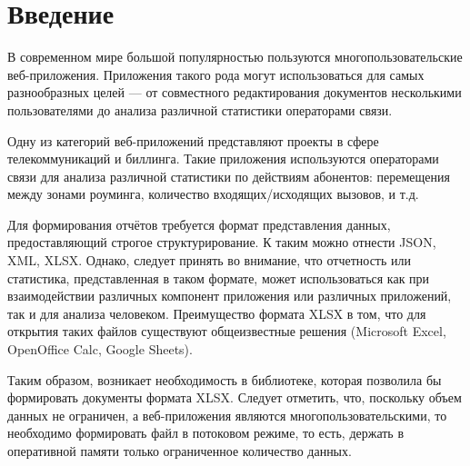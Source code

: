 \documentclass[14pt]{matmex-diploma}
\begin{document}
\maketitle
\tableofcontents
\section*{Введение}
В современном мире большой популярностью пользуются многопользовательские веб-приложения. Приложения такого рода могут использоваться для самых разнообразных целей --- от совместного редактирования документов несколькими пользователями до анализа различной статистики операторами связи.

Одну из категорий веб-приложений представляют проекты в сфере телекоммуникаций и биллинга. Такие приложения используются операторами связи для анализа различной статистики по действиям абонентов: перемещения между зонами роуминга, количество входящих/исходящих вызовов, и т.д.

Для формирования отчётов требуется формат представления данных, предоставляющий строгое структурирование. К таким можно отнести JSON, XML, XLSX. Однако, следует принять во внимание, что отчетность или статистика, представленная в таком формате, может использоваться как при взаимодействии различных компонент приложения или различных приложений, так и для анализа человеком. Преимущество формата XLSX в том, что для открытия таких файлов существуют общеизвестные решения (Microsoft Excel, OpenOffice Calc, Google Sheets). 

Таким образом, возникает необходимость в библиотеке, которая позволила бы формировать документы формата XLSX. Следует отметить, что, поскольку объем данных не ограничен, а веб-приложения являются многопользовательскими, то необходимо формировать файл в потоковом режиме, то есть, держать в оперативной памяти только ограниченное количество данных. 
\end{document}
